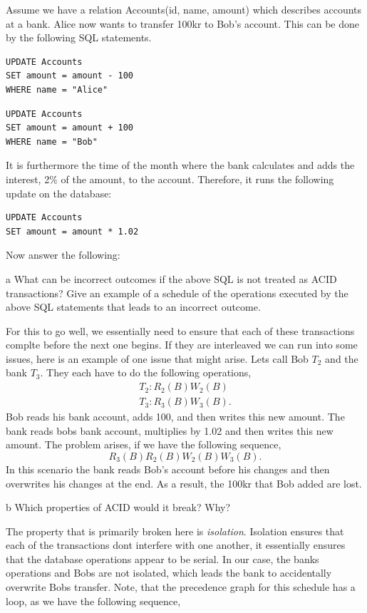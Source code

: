 \documentclass[working, oneside]{../../Preambles/tuftebook}
\begin{document}
\begin{exercise}[2]
Assume we have a relation Accounts(id, name, amount) which describes accounts at
a bank. Alice now wants to transfer 100kr to Bob’s account. This can be done by the
following SQL statements.
\begin{lstlisting}
UPDATE Accounts
SET amount = amount - 100
WHERE name = "Alice"
\end{lstlisting}
\begin{lstlisting}
UPDATE Accounts
SET amount = amount + 100
WHERE name = "Bob"
\end{lstlisting}
It is furthermore the time of the month where the bank calculates and adds the
interest, 2\% of the amount, to the account. Therefore, it runs the following update
on the database:
\begin{lstlisting}
UPDATE Accounts
SET amount = amount * 1.02
\end{lstlisting}
Now answer the following:
\end{exercise}
\begin{subexercise}{a}
What can be incorrect outcomes if the above SQL is not treated as ACID
transactions? Give an example of a schedule of the operations executed by the
above SQL statements that leads to an incorrect outcome.
\end{subexercise}
For this to go well, we essentially need to ensure that each of these transactions complte before the next one begins. If they are interleaved we can run into some issues, here is an example of one issue that might arise. Lets call Bob $T_2$ and the bank $T_3$. They each have to do the following operations,
\begin{align*}
    T_2: R_2\left( B \right) W_2\left( B \right)\\ 
    T_3: R_3\left( B \right) W_3\left( B \right)
.\end{align*}
Bob reads his bank account, adds 100, and then writes this new amount. The bank reads bobs bank account, multiplies by 1.02 and then writes this new amount. The problem arises, if we have the following sequence,
\[
R_3\left( B \right) R_2\left( B \right) W_2\left( B \right) W_3\left( B \right) 
.\] 
In this scenario the bank reads Bob's account before his changes and then overwrites his changes at the end. As a result, the 100kr that Bob added are lost.
\begin{subexercise}{b}
Which properties of ACID would it break? Why?
\end{subexercise}
The property that is primarily broken here is \textit{isolation}. Isolation ensures that each of the transactions dont interfere with one another, it essentially ensures that the database operations appear to be serial. In our case, the banks operations and Bobs are not isolated, which leads the bank to accidentally overwrite Bobs transfer. Note, that the precedence graph for this schedule has a loop, as we have the following sequence,
\end{document}
